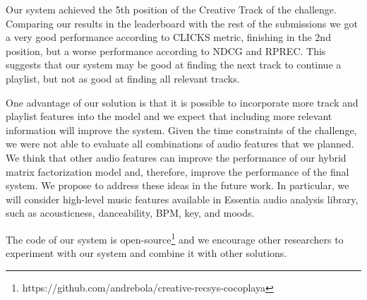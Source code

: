 Our system achieved the 5th position of the Creative Track of the challenge. Comparing our results in the leaderboard with the rest of the submissions we got a very good performance according to CLICKS metric, finishing in the 2nd position, but a worse performance according to NDCG and RPREC. This suggests that our system may be good at finding the next track to continue a playlist, but not as good at finding all relevant tracks.

One advantage of our solution is that it is possible to incorporate more track and playlist features into the model and we expect that including more relevant information will improve the system. Given the time constraints of the challenge, we were not able to evaluate all combinations of audio features that we planned. We think that other audio features can improve the performance of our hybrid matrix factorization model and, therefore, improve the performance of the final system.  We propose to address these ideas in the future work. In particular, we will consider high-level music features available in Essentia audio analysis library, such as acousticness, danceability, BPM, key, and moods.

The code of our system is open-source\footnote{https://github.com/andrebola/creative-recsys-cocoplaya} and we encourage other researchers to experiment with our system and combine it with other solutions.%
